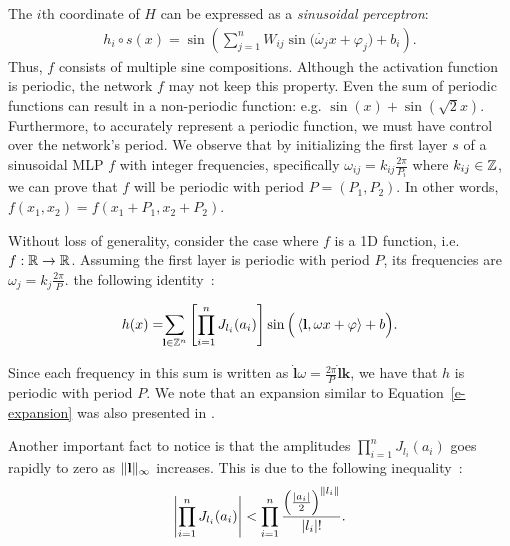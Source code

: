 The $i$th coordinate of $H$ can be expressed as a \textit{sinusoidal perceptron}:
%
\begin{align}
h_{i}\circ s(x)=\sin\left(\sum_{j=1}^{n} W_{ij} \sin\Big(\dot{\omega_j}{x}+\varphi_j\Big) + b_{i}\right).
\end{align}
%
Thus, $f$ consists of multiple sine compositions. Although  the activation function is periodic, the network $f$ may not keep this property. Even the sum of periodic functions can result in a non-periodic function: e.g. $\sin(x)+\sin\left(\sqrt{2}x\right)$. Furthermore, to accurately represent a periodic function, we must have control over the network's period.
We observe that by initializing the first layer $s$ of a sinusoidal MLP $f$ with integer frequencies, specifically $\omega_{ij}=k_{ij}\frac{2\pi}{P_i}$ where $k_{ij}\in\mathbb{Z}$, we can prove that $f$ will be periodic with period $P=(P_1,P_{2})$.
In other words, $f(x_1, x_2)=f(x_1+P_1, x_2+P_2)$.

Without loss of generality, consider the case where $f$ is a 1D function, i.e. $f:\mathbb{R}\to\mathbb{R}$.%
Assuming the first layer is periodic with period \( P \), its frequencies are \( \omega_j = k_j \frac{2\pi}{P} \).
 the following identity~\cite{novello2022understanding}:


\begin{align}\label{e-expansion}
    h(x)= \!\!\sum_{\textbf{l}\in\mathbb{Z}^n}\left[\prod_{i=1}^n J_{l_i}(a_i)\right]\sin\Big(\left\langle\textbf{l},\omega x +\varphi\right\rangle+ b\Big).
\end{align}

Since each frequency in this sum is written as $\dot{\textbf{l}}{\omega}=\frac{2\pi}{P}\dot{\textbf{l}}{\textbf{k}}$, we have that $h$ is periodic with period $P$.
We note that an expansion similar to Equation~\ref{e-expansion} was also presented in \cite{yuce2022structured}.

Another important fact to notice is that the amplitudes $\prod_{i=1}^n J_{l_i}(a_i)$ goes rapidly to zero as $\lVert\textbf{l}\rVert_{\infty}$ increases. This is due to the following inequality~\cite{novello2022understanding}:
\begin{align}\label{e-upper-bound-freq}
    \left|\prod_{i=1}^n J_{l_i}(a_i)\right|<
    \prod_{i=1}^n\frac{\left(\frac{\left|a_i\right|}{2}\right)^{\lVert l_i\rVert}}{\left|l_i\right|!}.
\end{align}

